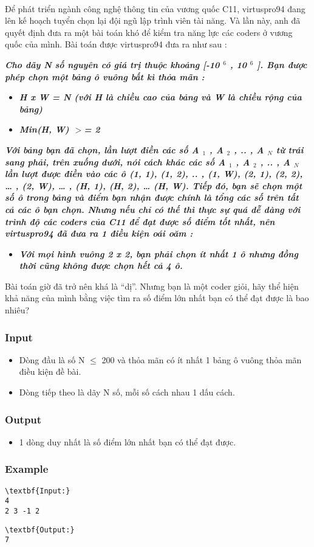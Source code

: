 

 

Để phát triển ngành công nghệ thông tin của vương quốc C11, virtuspro94 đang lên kế hoạch tuyển chọn lại đội ngũ lập trình viên tài năng. Và lần này, anh đã quyết định đưa ra một bài toán khó để kiểm tra năng lực các coders ở vương quốc của mình. Bài toán được virtuspro94 đưa ra như sau :

\emph{\textbf{Cho dãy N số nguyên có giá trị thuộc khoảng [-10 $^ 6 $ , 10 $^ 6 $ ]. Bạn được phép chọn một bảng ô vuông bất kì thỏa mãn : }}
\begin{itemize}
	\item \emph{\textbf{H x W = N (với H là chiều cao của bảng và W là chiều rộng của bảng) }}
	\item \emph{\textbf{Min(H, W) $>$= 2 }}
\end{itemize}

\emph{\textbf{Với bảng bạn đã chọn, lần lượt điền các số A $_ 1 $ , A $_ 2 $ , .. , A $_ N $ từ trái sang phải, trên xuống dưới, nói cách khác các số A $_ 1 $ , A $_ 2 $ , .. , A $_ N $ lần lượt được điền vào các ô (1, 1), (1, 2), .. , (1, W), (2, 1), (2, 2), … , (2, W), … , (H, 1), (H, 2), … (H, W). Tiếp đó, bạn sẽ chọn một số ô trong bảng và điểm bạn nhận được chính là tổng các số trên tất cả các ô bạn chọn. Nhưng nếu chỉ có thế thì thực sự quá dễ dàng với trình độ các coders của C11 để đạt được số điểm tốt nhất, nên virtuspro94 đã đưa ra 1 điều kiện oái oăm : }}
\begin{itemize}
	\item \emph{\textbf{Với mọi hình vuông 2 x 2, bạn phải chọn ít nhất 1 ô nhưng đồng thời cũng không được chọn hết cả 4 ô. }}
\end{itemize}

Bài toán giờ đã trở nên khá là “dị”. Nhưng bạn là một coder giỏi, hãy thể hiện khả năng của mình bằng việc tìm ra số điểm lớn nhất bạn có thể đạt được là bao nhiêu?

\subsubsection{Input}
\begin{itemize}
	\item Dòng đầu là số N  $\le$  200 và thỏa mãn có ít nhất 1 bảng ô vuông thỏa mãn điều kiện đề bài.
	\item Dòng tiếp theo là dãy N số, mỗi số cách nhau 1 dấu cách.
\end{itemize}

\subsubsection{Output}
\begin{itemize}
	\item 1 dòng duy nhất là số điểm lớn nhất bạn có thể đạt được.
\end{itemize}

\subsubsection{Example}
\begin{verbatim}
\textbf{Input:}
4
2 3 -1 2\end{verbatim}
\begin{verbatim}
\textbf{Output:}
7\end{verbatim}
